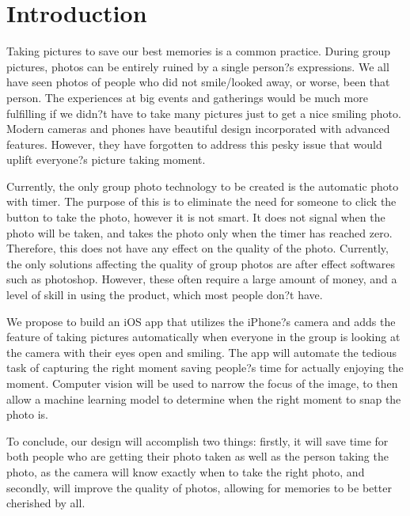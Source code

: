 \chapter{Introduction}
Taking pictures to save our best memories is a common practice. During group pictures, photos can be entirely ruined by a single person?s expressions. We all have seen photos of people who did not smile/looked away, or worse, been that person. The experiences at big events and gatherings would be much more fulfilling if we didn?t have to take many pictures just to get a nice smiling photo. Modern cameras and phones have beautiful design incorporated with advanced features. However, they have forgotten to address this pesky issue that would uplift everyone?s picture taking moment. 

Currently, the only group photo technology to be created is the automatic photo with timer.  The purpose of this is to eliminate the need for someone to click the button to take the photo, however it is not smart.  It does not signal when the photo will be taken, and takes the photo only when the timer has reached zero.  Therefore, this does not have any effect on the quality of the photo.  Currently, the only solutions affecting the quality of group photos are after effect softwares such as photoshop.  However, these often require a large amount of money, and a level of skill in using the product, which most people don?t have.

We propose to build an iOS app that utilizes the iPhone?s camera and adds the feature of taking pictures automatically when everyone in the group is looking at the camera with their eyes open and smiling. The app will automate the tedious task of capturing the right moment saving people?s time for actually enjoying the moment.  Computer vision will be used to narrow the focus of the image, to then allow a machine learning model to determine when the right moment to snap the photo is.

To conclude, our design will accomplish two things: firstly, it will save time for both people who are getting their photo taken as well as the person taking the photo, as the camera will know exactly when to take the right photo, and secondly, will improve the quality of photos, allowing for memories to be better cherished by all. 


